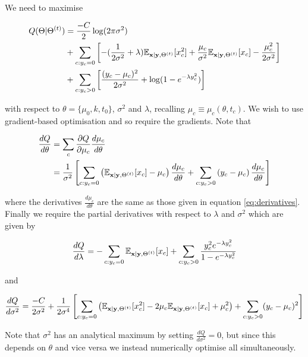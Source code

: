 We need to maximise

\begin{equation}
\begin{aligned}
Q(\Theta | \Theta^{(t)}) &= \frac{-C}{2} \log(2 \pi \sigma^2) \\
& +
\sum_{c: y_c = 0} \left[ -(\frac{1}{2\sigma^2} + \lambda) \mathbb{E}_{{\bf x} | {\bf y}, \Theta^{(t)}} [ x_c^2 ] + \frac{\mu_c}{\sigma^2} \mathbb{E}_{{\bf x} | {\bf y}, \Theta^{(t)}} [ x_c ] - \frac{\mu_c^2}{2\sigma^2}\right] \\
& +
\sum_{c: y_c > 0} \left[ \frac{(y_c - \mu_c)^2}{2 \sigma^2} + \log(1 - e^{-\lambda y_c^2}) \right]
\end{aligned}
\end{equation}

with respect to $\theta = \{\mu_0, k, t_0\}$, $\sigma^2$ and $\lambda$, recalling $\mu_c \equiv \mu_c(\theta, t_c)$. We wish to use gradient-based optimisation and so require the gradients. Note that

\begin{equation}
\begin{aligned}
\frac{dQ}{d\theta} &= \sum_c \frac{\partial Q}{\partial \mu_c} \frac{d \mu_c}{d \theta} \\
& = \frac{1}{\sigma^2} \left[ \sum_{c: y_c = 0} \left(  \mathbb{E}_{{\bf x} | {\bf y}, \Theta^{(t)}} [ x_c ] - \mu_c \right) \frac{d \mu_c}{d \theta} +
\sum_{c: y_c > 0} \left( y_c - \mu_c \right) \frac{d \mu_c}{d \theta}\right]
\end{aligned}
\end{equation}

where the derivatives $\frac{d \mu_c}{d \theta}$ are the same as those given in equation \ref{eq:derivatives}. Finally we require the partial derivatives with respect to $\lambda$ and $\sigma^2$ which are given by

\begin{equation}
\frac{dQ}{d \lambda} = -\sum_{c: y_c = 0}  \mathbb{E}_{{\bf x} | {\bf y}, \Theta^{(t)}} [ x_c ] +
\sum_{c: y_c > 0} \frac{y_c^2 e^{-\lambda y_c^2}}{1 - e^{-\lambda y_c^2}}
\end{equation}

and

\begin{equation}
\frac{dQ}{d\sigma^2} = \frac{-C}{2\sigma^2} +
\frac{1}{2 \sigma^4} \left[ \sum_{c: y_c = 0} \left( \mathbb{E}_{{\bf x} | {\bf y}, \Theta^{(t)}} [ x_c^2 ] - 2 \mu_c \mathbb{E}_{{\bf x} | {\bf y}, \Theta^{(t)}} [ x_c ] + \mu_c^2 \right) +
\sum_{c: y_c > 0} (y_c - \mu_c)^2 \right]
\end{equation}

Note that $\sigma^2$ has an analytical maximum by setting $\frac{dQ}{d\sigma^2} = 0$, but since this depends on $\theta$ and vice versa we instead numerically optimise all simultaneously.
